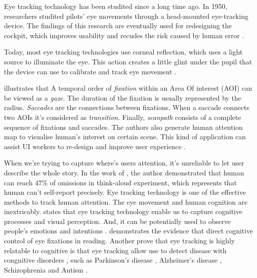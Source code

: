 
Eye tracking technology has been studited since a long time ago. In 1950, researchers studited pilots' eye movements through a head-mounted eye-tracking device. The findings of this research are eventually used for redesigning the cockpit, which improves usability and recudes the risk caused by human error \citep{Fitts2005Cockpit, Cooke2005EyeTrackingUsability}.

Today, most eye tracking technologies use corneal reflection, which uses a light source to illuminate the eye. This action creates a little glint under the pupil that the device can use to calibrate and track eye movement \citep{Schall2014EyeTrackingIntro, Fitts2005Cockpit}.

\citet{Blascheck2014VisualisingEyeTracking} illustrates that A temporal order of \textit{fixation} within an Area Of interest (AOI) can be viewed as a \textit{gaze}. The duration of the fixation is usually represented by the radius. \textit{Saccades} are the connections between fixations. When a saccade connects two AOIs it's considered as  \textit{transition}. Finally, \textit{scanpath} consists of a complete sequence of fixations and saccades. The authors also generate human attention map to visualise human's interest on certain scene. This kind of application can assist UI workers to re-design and improve user experience \citep{Schall2014EyeTrackingIntro}.


When we're trying to capture where's users attention, it's unreliable to let user describe the whole story. In the work of \citet{Guan2006ThinkAloud}, the author demonstrated that human can reach 47\% of omissions in think-aloud experiment, which represents that human can't self-report precisely. Eye tracking technology is one of the effective methods to track human attention. The eye movement and human cognition are inextricably. \citep{Schall2014EyeTrackingIntro} states that eye tracking technology enable us to capture cognitive processes and visual perception. And, it can be potentially used to observe people's emotions and intentions \citep{Harezlak2018EyeTrackingInMedicine}. \citet{Rayner2015EvidenceCongnitiveFixation} demonstrates the evidence that direct cognitive control of eye fixations in reading. Another prove that eye tracking is highly relatable to cognitive is that eye tracking allow use to detect disease with congnitive disorders \citep{Harezlak2018EyeTrackingInMedicine}, such as Parkinson's disease \citep{S2016Parkinson}, Alzheimer's disease \citep{Crawford2015Alzheimer},
Schizophrenia \citep{Levy2010Schizophrenia} and Autism \citep{Belen2021Autism}.


